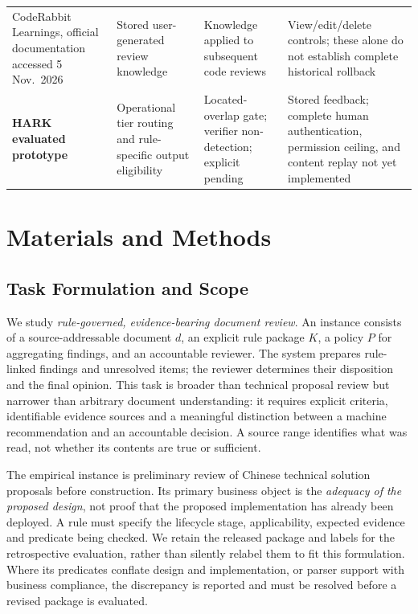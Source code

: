 \documentclass[computers,article,submit,moreauthors]{Definitions/mdpi}
\begin{document}
\begin{table}[!ht]
\begin{tabularx}{\textwidth}{@{}>{\raggedright\arraybackslash}p{2.6cm}>{\raggedright\arraybackslash}X>{\raggedright\arraybackslash}X>{\raggedright\arraybackslash}X@{}}
CodeRabbit Learnings, official documentation accessed 5 Nov.\ 2026~\cite{coderabbitLearnings} & Stored user-generated review knowledge & Knowledge applied to subsequent code reviews & View/edit/delete controls; these alone do not establish complete historical rollback \\
\textbf{HARK evaluated prototype} & Operational tier routing and rule-specific output eligibility & Located-overlap gate; verifier non-detection; explicit pending & Stored feedback; complete human authentication, permission ceiling, and content replay not yet implemented \\
\bottomrule
\end{tabularx}
\end{table}


\section{Materials and Methods}

\subsection{Task Formulation and Scope}\label{sec:problem}

We study \emph{rule-governed, evidence-bearing document review}. An instance consists of a source-addressable document $d$, an explicit rule package $K$, a policy $P$ for aggregating findings, and an accountable reviewer. The system prepares rule-linked findings and unresolved items; the reviewer determines their disposition and the final opinion. This task is broader than technical proposal review but narrower than arbitrary document understanding: it requires explicit criteria, identifiable evidence sources and a meaningful distinction between a machine recommendation and an accountable decision. A source range identifies what was read, not whether its contents are true or sufficient.

The empirical instance is preliminary review of Chinese technical solution proposals before construction. Its primary business object is the \emph{adequacy of the proposed design}, not proof that the proposed implementation has already been deployed. A rule must specify the lifecycle stage, applicability, expected evidence and predicate being checked. We retain the released package and labels for the retrospective evaluation, rather than silently relabel them to fit this formulation. Where its predicates conflate design and implementation, or parser support with business compliance, the discrepancy is reported and must be resolved before a revised package is evaluated.
\end{document}
